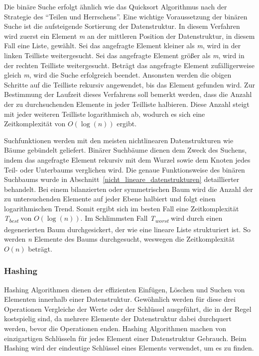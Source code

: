 Die binäre Suche erfolgt ähnlich wie das Quicksort Algorithmus nach der Strategie des \enquote{Teilen und Herrschens}. Eine wichtige Voraussetzung der binären Suche ist die aufsteigende Sortierung der Datenstruktur. In diesem Verfahren wird zuerst ein Element \textit{m} an der mittleren Position der Datenstruktur, in diesem Fall eine Liste, gewählt. Sei das angefragte Element kleiner als \textit{m}, wird in der linken Teilliste weitergesucht. Sei das angefragte Element größer als \textit{m}, wird in der rechten Teilliste weitergesucht. Beträgt das angefragte Element zufälligerweise gleich \textit{m}, wird die Suche erfolgreich beendet. Ansonsten werden die obigen Schritte auf die Teilliste rekursiv angewendet, bis das Element gefunden wird. Zur Bestimmung der Laufzeit dieses Verfahrens soll bemerkt werden, dass die Anzahl der zu durchsuchenden Elemente in jeder Teilliste halbieren. Diese Anzahl steigt mit jeder weiteren Teilliste logarithmisch ab, wodurch es sich eine Zeitkomplexität von $O(\log(n))$ ergibt. \autocite[224-226]{hubwieser_fundamente_2015}

Suchfunktionen werden mit den meisten nichtlinearen Datenstrukturen wie Bäume gebündelt geliefert. Binärer Suchbäume dienen dem Zweck des Suchens, indem das angefragte Element rekursiv mit dem Wurzel sowie dem Knoten jedes Teil- oder Unterbaums verglichen wird. Die genaue Funktionsweise des binären Suchbaums wurde in Abschnitt~\ref{nicht_lineare_datenstrukturen} detaillierter behandelt. Bei einem bilanzierten oder symmetrischen Baum wird die Anzahl der zu untersuchenden Elemente auf jeder Ebene halbiert und folgt einen logarithmischen Trend. Somit ergibt sich im besten Fall eine Zeitkomplexität \textit{T\textsubscript{best}} von $O(\log(n))$. Im Schlimmsten Fall \textit{T\textsubscript{worst}} wird durch einen degenerierten Baum durchgesickert, der wie eine lineare Liste strukturiert ist. So werden \textit{n} Elemente des Baums durchgesucht, weswegen die Zeitkomplexität $O(n)$ beträgt. \autocite[226-228]{hubwieser_fundamente_2015}

\subsubsection{Hashing}

Hashing Algorithmen dienen der effizienten Einfügen, Löschen und Suchen von Elementen innerhalb einer Datenstruktur. Gewöhnlich werden für diese drei Operationen Vergleiche der Werte oder der Schlüssel ausgeführt, die in der Regel kostspielig sind, da mehrere Elemente der Datenstruktur dabei durchquert werden, bevor die Operationen enden. Hashing Algorithmen machen von einzigartigen Schlüsseln für jedes Element einer Datenstruktur Gebrauch. Beim Hashing wird der eindeutige Schlüssel eines Elements verwendet, um es zu finden. \autocite[229]{hubwieser_fundamente_2015}

